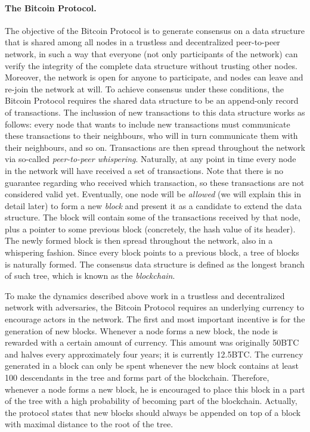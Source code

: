 \paragraph{\bf The Bitcoin Protocol.} The objective of the Bitcoin Protocol is to generate consensus on a data structure that is shared among all nodes in a trustless and decentralized peer-to-peer network, in such a way that everyone (not only participants of the network) can verify the integrity of the complete data structure without trusting other nodes. Moreover, the network is open for anyone to participate, and nodes can leave and re-join the network at will. To achieve consensus under these conditions, the Bitcoin Protocol requires the shared data structure to be an append-only record of transactions. The inclussion of new transactions to this data structure works as follows: every node that wants to include new transactions must communicate these transactions to their neighbours, who will in turn communicate them with their neighbours, and so on. Transactions are then spread throughout the network via so-called \emph{peer-to-peer whispering}. Naturally, at any point in time every node in the network will have received a set of transactions. Note that there is no guarantee regarding who received which transaction, so these transactions are not considered valid yet. Eventually, one node will be \emph{allowed} (we will explain this in detail later) to form a new \emph{block} and present it as a candidate to extend the data structure. The block will contain some of the transactions received by that node, plus a pointer to some previous block (concretely, the hash value of its header). The newly formed block is then spread throughout the network, also in a whispering fashion. Since every block points to a previous block, a tree of blocks is naturally formed. The consensus data structure is defined as the longest branch of such tree, which is known as the \emph{blockchain}.

To make the dynamics described above work in a trustless and decentralized network with adversaries, the Bitcoin Protocol requires an underlying currency to encourage actors in the network. The first and most important incentive is for the generation of new blocks. Whenever a node forms a new block, the node is rewarded with a certain amount of currency. This amount was originally 50BTC and halves every approximately four years; it is currently 12.5BTC. The currency generated in a block can only be spent whenever the new block contains at least 100 descendants in the tree and forms part of the blockchain. Therefore, whenever a node forms a new block, he is encouraged to place this block in a part of the tree with a high probability of becoming part of the blockchain. Actually, the protocol states that new blocks should always be appended on top of a block with maximal distance to the root of the tree.

